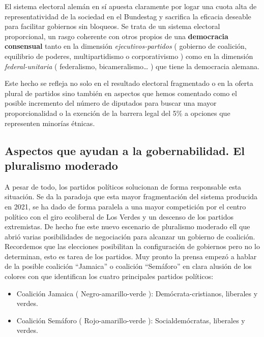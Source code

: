 \documentclass[
]{article}
\providecommand{\tightlist}{%
  \setlength{\itemsep}{0pt}\setlength{\parskip}{0pt}}
\begin{document}
El sistema electoral alemán en sí apuesta claramente por logar una cuota
alta de representatividad de la sociedad en el Bundestag y sacrifica la
eficacia deseable para facilitar gobiernos sin bloqueos. Se trata de un
sistema electoral proporcional, un rasgo coherente con otros propios de
una \textbf{democracia consensual} tanto en la dimensión
\emph{ejecutivos-partidos} ( gobierno de coalición, equilibrio de
poderes, multipartidismo o corporativismo ) como en la dimensión
\emph{federal-unitaria} ( federalismo, bicameralismo\ldots{} ) que tiene
la democracia alemana.

Este hecho se refleja no solo en el resultado electoral fragmentado o en
la oferta plural de partidos sino también en aspectos que hemos
comentado como el posible incremento del número de diputados para buscar
una mayor proporcionalidad o la exención de la barrera legal del 5\% a
opciones que representen minorías étnicas.

\hypertarget{aspectos-que-ayudan-a-la-gobernabilidad.-el-pluralismo-moderado}{%
\subsection{Aspectos que ayudan a la gobernabilidad. El pluralismo
moderado}\label{aspectos-que-ayudan-a-la-gobernabilidad.-el-pluralismo-moderado}}

A pesar de todo, los partidos políticos solucionan de forma responsable
esta situación. Se da la paradoja que esta mayor fragmentación del
sistema producida en 2021, se ha dado de forma paralela a una mayor
competición por el centro político con el giro ecoliberal de Los Verdes
y un descenso de los partidos extremistas. De hecho fue este nuevo
escenario de pluralismo moderado ell que abrió varias posibilidades de
negociación para alcanzar un gobierno de coalición. Recordemos que las
elecciones posibilitan la configuración de gobiernos pero no lo
determinan, esto es tarea de los partidos. Muy pronto la prensa empezó a
hablar de la posible coalición ``Jamaica'' o coalición ``Semáforo'' en
clara alusión de los colores con que identifican los cuatro principales
partidos políticos:

\begin{itemize}
\tightlist
\item
  Coalición Jamaica ( Negro-amarillo-verde ): Demócrata-cristianos,
  liberales y verdes.
\item
  Coalición Semáforo ( Rojo-amarillo-verde ): Socialdemócratas,
  liberales y verdes.
\end{itemize}
\end{document}
